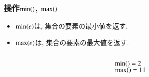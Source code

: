 \documentclass[main]{subfiles}
\begin{document}
\begin{frame}\frametitle{操作$\mathrm{min}()$, $\mathrm{max}()$}
\begin{itemize}
	\item $\mathrm{min}(e)$は, 集合の要素の最小値を返す.\\
	\item $\mathrm{max}(e)$は, 集合の要素の最大値を返す.\\
\end{itemize}

\begin{columns}[c]
	\begin{column}{0.5\linewidth}
		
	\end{column}
	\begin{column}{0.49\linewidth}
		$\mathrm{min}() = 2$\\
		$\mathrm{max}() = 11$\\
	\end{column}
\end{columns}
\end{frame}
\end{document}
